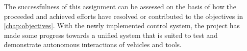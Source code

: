 The successfulness of this assignment can be assessed on the basis of how the proceeded and achieved efforts have resolved or contributed to the objectives in \cref{chap:objectives}. With the newly implemented control system, the project has made some progress towards a unified system that is suited to test and demonstrate autonomous interactions of vehicles and tools.